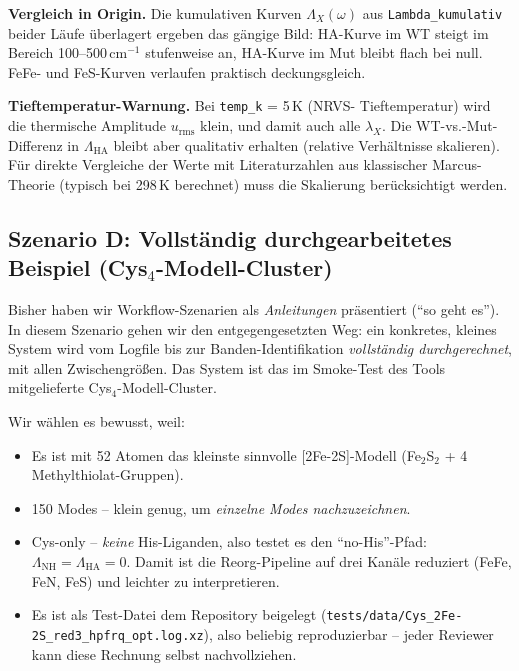 \documentclass[11pt,a4paper,twoside]{article}
\theoremstyle{remark}
\begin{document}
\textbf{Vergleich in Origin.} Die kumulativen Kurven
$\Lambda_X(\omega)$ aus \texttt{Lambda\_kumulativ} beider L\"aufe
\"uberlagert ergeben das g\"angige Bild: HA-Kurve im WT steigt im
Bereich 100--500\,cm$^{-1}$ stufenweise an, HA-Kurve im Mut bleibt
flach bei null. FeFe- und FeS-Kurven verlaufen praktisch
deckungsgleich.

\begin{warnbox}
\textbf{Tieftemperatur-Warnung.} Bei \texttt{temp\_k} = 5\,K (NRVS-
Tieftemperatur) wird die thermische Amplitude $u_\text{rms}$ klein,
und damit auch alle $\lambda_X$. Die WT-vs.-Mut-Differenz in
$\Lambda_\text{HA}$ bleibt aber qualitativ erhalten (relative
Verh\"altnisse skalieren). F\"ur direkte Vergleiche der Werte mit
Literaturzahlen aus klassischer Marcus-Theorie (typisch bei 298\,K
berechnet) muss die Skalierung ber\"ucksichtigt werden.
\end{warnbox}

\subsection{Szenario D: Vollst\"andig durchgearbeitetes Beispiel
            (Cys$_4$-Modell-Cluster)}
\label{sec:workflow-worked-example}

Bisher haben wir Workflow-Szenarien als \emph{Anleitungen} pr\"asentiert
("`so geht es"'). In diesem Szenario gehen wir den entgegengesetzten Weg:
ein konkretes, kleines System wird vom Logfile bis zur
Banden-Identifikation \emph{vollst\"andig durchgerechnet}, mit allen
Zwischengr\"o{\ss}en. Das System ist das im Smoke-Test des Tools
mitgelieferte Cys$_4$-Modell-Cluster.

Wir w\"ahlen es bewusst, weil:
\begin{itemize}\setlength{\itemsep}{0pt}
  \item Es ist mit 52 Atomen das kleinste sinnvolle [2Fe-2S]-Modell
        (Fe$_2$S$_2$ + 4 Methylthiolat-Gruppen).
  \item 150 Modes -- klein genug, um \emph{einzelne Modes
        nachzuzeichnen}.
  \item Cys-only -- \emph{keine} His-Liganden, also testet es den
        "`no-His"'-Pfad: $\Lambda_\text{NH} = \Lambda_\text{HA} = 0$.
        Damit ist die Reorg-Pipeline auf drei Kan\"ale reduziert
        (FeFe, FeN, FeS) und leichter zu interpretieren.
  \item Es ist als Test-Datei dem Repository beigelegt
        (\texttt{tests/data/Cys\_2Fe-2S\_red3\_hpfrq\_opt.log.xz}),
        also beliebig reproduzierbar -- jeder Reviewer kann diese
        Rechnung selbst nachvollziehen.
\end{itemize}
\end{document}
